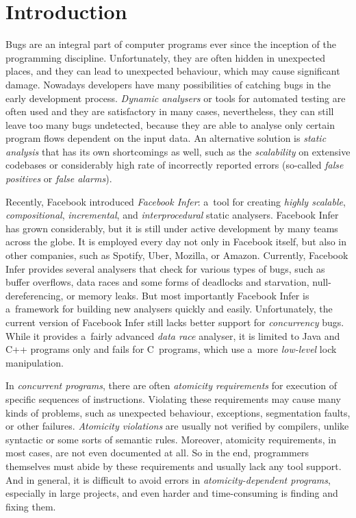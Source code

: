 

\chapter{Introduction}

Bugs are an integral part of computer programs ever since the inception
of the programming discipline. Unfortunately, they are often hidden
in unexpected places, and they can lead to unexpected behaviour, which
may cause significant damage. Nowadays developers have many possibilities
of catching bugs in the early development process. \emph{Dynamic analysers}
or tools for automated testing are often used and they are satisfactory in
many cases, nevertheless, they can still leave too many bugs undetected,
because they are able to analyse only certain program flows dependent on
the input data. An alternative solution is \emph{static analysis} that has
its own shortcomings as well, such as the \emph{scalability} on extensive
codebases or considerably high rate of incorrectly reported errors
(so-called \emph{false positives} or \emph{false alarms}).

Recently, Facebook introduced \emph{Facebook Infer}: a~tool for
creating \emph{highly scalable}, \emph{compositional}, \emph{incremental},
and \emph{interprocedural} static analysers. Facebook Infer has grown
considerably, but it is still under active development
by many teams across the globe. It is employed every day not only in
Facebook itself, but also in other companies, such as Spotify, Uber, Mozilla,
or Amazon. Currently, Facebook Infer provides several analysers that check
for various types
of bugs, such as buffer overflows, data races and some forms of deadlocks
and starvation, null-dereferencing, or memory leaks. But most importantly
Facebook Infer is a~framework for building new analysers quickly and easily.
Unfortunately, the current version of Facebook Infer still lacks better
support for \emph{concurrency} bugs. While it provides a~fairly advanced
\emph{data race} analyser, it is limited to Java and C++ programs only and
fails for C~programs, which use a~more \emph{low-level} lock manipulation.

In \emph{concurrent programs}, there are often \emph{atomicity requirements}
for execution of specific sequences of instructions. Violating these
requirements may cause many kinds of problems, such as unexpected
behaviour, exceptions, segmentation faults, or other failures.
\emph{Atomicity violations} are usually not verified by compilers,
unlike syntactic or some sorts of semantic rules. Moreover, atomicity
requirements, in most cases, are not even documented at all. So in the
end, programmers themselves must abide by these requirements and usually
lack any tool support. And in general, it is difficult to avoid
errors in \emph{atomicity-dependent programs}, especially in large projects,
and even harder and time-consuming is finding and fixing them.

